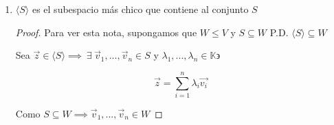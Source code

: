 \documentclass[12pt]{article}
\newcommand\K{\ensuremath{\mathbb{K}}}
\begin{document}
\begin{enumerate}
\begin{proof}
\begin{enumerate}
        Por el inciso ii) $\implies {\lambda}_{1}{\vec{v}}_{1} + {\lambda}_{2}{\vec{v}}_{2} \in W$

        \item Supongamos cierto el resultado para $n=k$

        \item Sean ${\vec{v}}_{1},...,{\vec{v}}_{k},{\vec{v}}_{k+1} \in W$ y ${\lambda}_{1},...,{\lambda}_{k},{\lambda}_{k+1} \in \K$

        Veamos que 

        \begin{equation*}
            {\lambda}_{1}{\vec{v}}_{1}+...+{\lambda}_{k}{\vec{v}}_{k}+{\lambda}_{k+1}{\vec{v}}_{k+1} = ({\lambda}_{1}{\vec{v}}_{1}+...+{\lambda}_{k}{\vec{v}}_{k})+{\lambda}_{k+1}{\vec{v}}_{k+1}
        \end{equation*}

        Por el supuesto que el resultado es cierto en $n=k$, la combinación lineal dentro del paréntesis $\in W$. El término restante también $\in W$, por el inciso ii) del \textbf{Lema}

        \begin{equation*}
            {\lambda}_{1}{\vec{v}}_{1}+...+{\lambda}_{k}{\vec{v}}_{k}+{\lambda}_{k+1}{\vec{v}}_{k+1} \in W
        \end{equation*}
    \end{enumerate}
\end{proof}

\item $\langle S \rangle$ es el subespacio más chico que contiene al conjunto $S$

\begin{proof}
     Para ver esta nota, supongamos que $W \leq V$ y $S \subseteq W$ P.D. $\langle S \rangle \subseteq W$

    Sea $\vec{z} \in \langle S \rangle \implies \: \exists \: {\vec{v}}_{1},...,{\vec{v}}_{n} \in S$ y $\lambda_1,...,\lambda_n \in \K \backepsilon$

    \begin{equation*}
        \vec{z} = \sum_{i=1}^{n} \lambda_i \vec{v_i}
    \end{equation*}

    Como $S \subseteq W \implies {\vec{v}}_{1},...,{\vec{v}}_{n} \in W$
\end{proof}


\end{enumerate}
\end{document}
